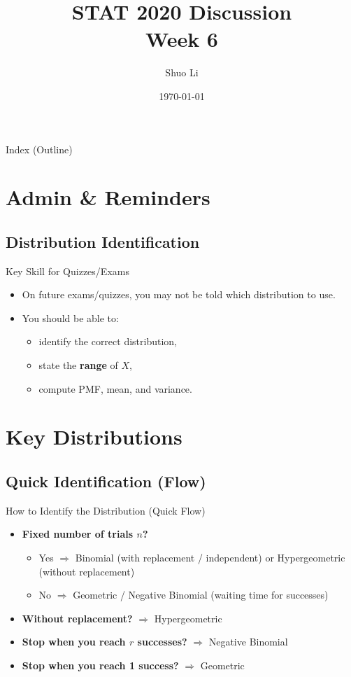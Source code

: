 \documentclass{beamer}
\title[STAT 2020 Discussion \hspace{4em} \insertframenumber/\inserttotalframenumber]
{STAT 2020 Discussion \\ Week 6}
\author[Shuo Li]{Shuo Li}
\date{\today}
\institute[The University of Iowa]{The University of Iowa\\
Department of Statistics and Actuarial Science}
\begin{document}
\frame{\titlepage}

\begin{frame}{Index (Outline)}
\tableofcontents[hideallsubsections]
\end{frame}

\section{Admin \& Reminders}


\subsection{Distribution Identification}

\begin{frame}{Key Skill for Quizzes/Exams}
\begin{itemize}
  \item On future exams/quizzes, you may \alert{not be told} which distribution to use.
  \item You should be able to:
  \begin{itemize}
    \item identify the correct distribution,
    \item state the \textbf{range} of $X$,
    \item compute PMF, mean, and variance.
  \end{itemize}
\end{itemize}
\end{frame}

\section{Key Distributions}

\subsection{Quick Identification (Flow)}

\begin{frame}{How to Identify the Distribution (Quick Flow)}
\begin{itemize}
  \item \textbf{Fixed number of trials $n$?}
  \begin{itemize}
    \item Yes $\Rightarrow$ Binomial (with replacement / independent) or Hypergeometric (without replacement)
    \item No  $\Rightarrow$ Geometric / Negative Binomial (waiting time for successes)
  \end{itemize}
  \item \textbf{Without replacement?} $\Rightarrow$ Hypergeometric
  \item \textbf{Stop when you reach $r$ successes?} $\Rightarrow$ Negative Binomial
  \item \textbf{Stop when you reach 1 success?} $\Rightarrow$ Geometric
\end{itemize}
\end{frame}
\end{document}
